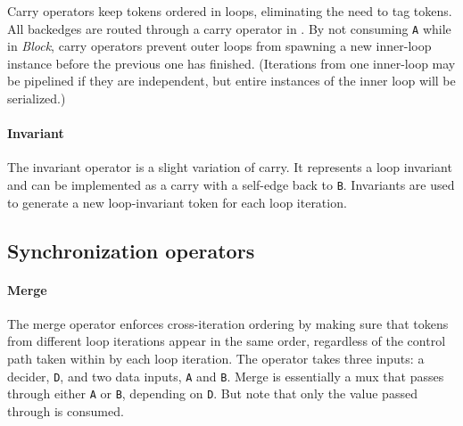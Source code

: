 Carry operators keep tokens ordered in loops, eliminating the need to tag tokens.
%
All backedges are routed through a carry operator in \riptide.
%
% 
By not consuming {\tt A} while in {\em Block}, carry operators prevent
outer loops from spawning a new inner-loop instance before the
previous one has finished.
%
(Iterations from one inner-loop may be pipelined if they are independent, but entire instances of the inner loop will be serialized.)

\paragraph{Invariant}
The invariant operator is a slight variation of carry.
%
It represents a loop invariant and can be implemented as a carry with a self-edge back to {\tt B}.
%
Invariants are used to generate a new loop-invariant token for each loop iteration.

%

\subsection{Synchronization operators}

\paragraph{Merge}
The merge operator enforces cross-iteration ordering by making sure that tokens from different loop iterations
appear in the same order, regardless of the control path taken within by each loop iteration.
% 
The operator takes three inputs: a decider, {\tt D}, and two data inputs, {\tt A} and {\tt B}.
%
Merge is essentially a mux that passes through either {\tt A} or {\tt B}, depending on {\tt D}.
%
But note that only the value passed through is consumed.

